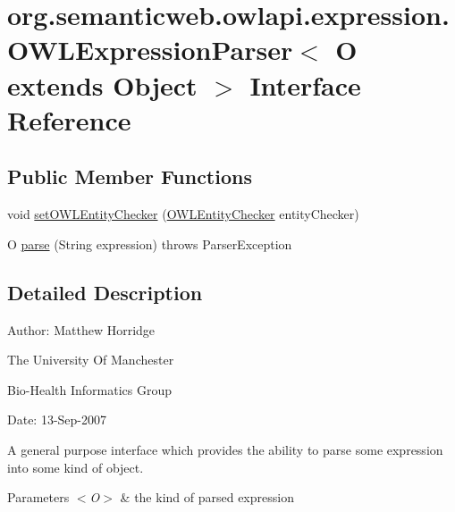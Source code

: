 \hypertarget{interfaceorg_1_1semanticweb_1_1owlapi_1_1expression_1_1_o_w_l_expression_parser_3_01_o_01extends_01_object_01_4}{\section{org.\-semanticweb.\-owlapi.\-expression.\-O\-W\-L\-Expression\-Parser$<$ O extends Object $>$ Interface Reference}
\label{interfaceorg_1_1semanticweb_1_1owlapi_1_1expression_1_1_o_w_l_expression_parser_3_01_o_01extends_01_object_01_4}
}
\subsection*{Public Member Functions}
\begin{DoxyCompactItemize}
\item 
void \hyperlink{interfaceorg_1_1semanticweb_1_1owlapi_1_1expression_1_1_o_w_l_expression_parser_3_01_o_01extends_01_object_01_4_a37c6e763878df46240c49dfa075c8761}{set\-O\-W\-L\-Entity\-Checker} (\hyperlink{interfaceorg_1_1semanticweb_1_1owlapi_1_1expression_1_1_o_w_l_entity_checker}{O\-W\-L\-Entity\-Checker} entity\-Checker)
\item 
O \hyperlink{interfaceorg_1_1semanticweb_1_1owlapi_1_1expression_1_1_o_w_l_expression_parser_3_01_o_01extends_01_object_01_4_a3b0d68408bc8814ccf1aac80f2e48f0e}{parse} (String expression)  throws Parser\-Exception
\end{DoxyCompactItemize}


\subsection{Detailed Description}
Author\-: Matthew Horridge\par
 The University Of Manchester\par
 Bio-\/\-Health Informatics Group\par
 Date\-: 13-\/\-Sep-\/2007\par
\par


A general purpose interface which provides the ability to parse some expression into some kind of object. 
\begin{DoxyParams}{Parameters}
{\em $<$\-O$>$} & the kind of parsed expression \\
\hline
\end{DoxyParams}


